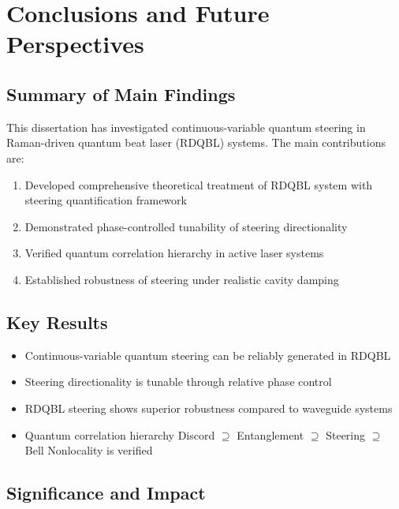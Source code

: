 
\chapter{Conclusions and Future Perspectives}
\label{chp6}
\newpage

\section{Summary of Main Findings}

This dissertation has investigated continuous-variable quantum steering in Raman-driven quantum beat laser (RDQBL) systems. The main contributions are:

\begin{enumerate}
	\item Developed comprehensive theoretical treatment of RDQBL system with steering quantification framework
	\item Demonstrated phase-controlled tunability of steering directionality
	\item Verified quantum correlation hierarchy in active laser systems
	\item Established robustness of steering under realistic cavity damping
\end{enumerate}

\section{Key Results}

\begin{itemize}
	\item Continuous-variable quantum steering can be reliably generated in RDQBL
	\item Steering directionality is tunable through relative phase control
	\item RDQBL steering shows superior robustness compared to waveguide systems
	\item Quantum correlation hierarchy Discord $\supseteq$ Entanglement $\supseteq$ Steering $\supseteq$ Bell Nonlocality is verified
\end{itemize}

\section{Significance and Impact}

